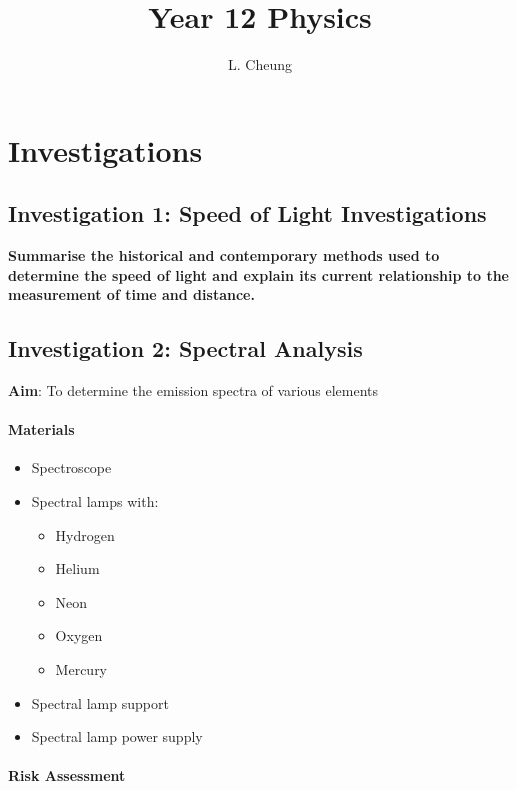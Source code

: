 \documentclass{report}
\title{\Huge Year 12 Physics}
\author{L. Cheung}
\begin{document}
	\maketitle
	\tableofcontents
\newpage

\chapter{Investigations}

	\section{Investigation 1: Speed of Light Investigations}
	
		\textbf{Summarise the historical and contemporary methods used to determine the speed of light and explain its current relationship to the measurement of time and distance.}
		
		

\newpage

	\section{Investigation 2: Spectral Analysis}
	
		\textbf{Aim}: To determine the emission spectra of various elements

		\subsubsection{Materials}
		
			\begin{itemize}
				\item Spectroscope
				\item Spectral lamps with:
					\begin{itemize}
						\item Hydrogen
						\item Helium
						\item Neon
						\item Oxygen
						\item Mercury
					\end{itemize}
				\item Spectral lamp support
				\item Spectral lamp power supply
			\end{itemize}

		\subsubsection{Risk Assessment}
\end{document}
